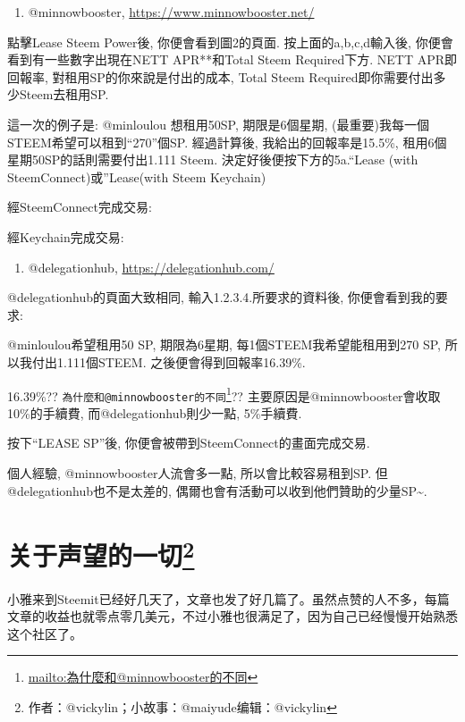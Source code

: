\documentclass[]{ctexbook}
\providecommand{\tightlist}{%
  \setlength{\itemsep}{0pt}\setlength{\parskip}{0pt}}
\renewcommand{\href}[2]{#2\footnote{\url{#1}}}
\begin{document}
\begin{enumerate}
\def\labelenumi{\arabic{enumi}.}
\tightlist
\item
  @minnowbooster, \url{https://www.minnowbooster.net/}
\end{enumerate}

點擊Lease Steem Power後, 你便會看到圖2的頁面. 按上面的a,b,c,d輸入後, 你便會看到有一些數字出現在NETT APR**和Total Steem Required下方. NETT APR即回報率, 對租用SP的你來說是付出的成本, Total Steem Required即你需要付出多少Steem去租用SP.

這一次的例子是: @minloulou 想租用50SP, 期限是6個星期, (最重要)我每一個STEEM希望可以租到``270''個SP.
經過計算後, 我給出的回報率是15.5\%, 租用6個星期50SP的話則需要付出1.111 Steem.
決定好後便按下方的5a.``Lease (with SteemConnect)或''Lease(with Steem Keychain)

經SteemConnect完成交易:

經Keychain完成交易:

\begin{enumerate}
\def\labelenumi{\arabic{enumi}.}
\setcounter{enumi}{1}
\tightlist
\item
  @delegationhub, \url{https://delegationhub.com/}
\end{enumerate}

@delegationhub的頁面大致相同, 輸入1.2.3.4.所要求的資料後, 你便會看到我的要求:

@minloulou希望租用50 SP, 期限為6星期, 每1個STEEM我希望能租用到270 SP, 所以我付出1.111個STEEM.
之後便會得到回報率16.39\%.

16.39\%?? \href{mailto:為什麼和@minnowbooster的不同}{\nolinkurl{為什麼和@minnowbooster的不同}}?? 主要原因是@minnowbooster會收取10\%的手續費, 而@delegationhub則少一點, 5\%手續費.

按下``LEASE SP''後, 你便會被帶到SteemConnect的畫面完成交易.

個人經驗, @minnowbooster人流會多一點, 所以會比較容易租到SP. 但@delegationhub也不是太差的, 偶爾也會有活動可以收到他們贊助的少量SP\textasciitilde{}.

\section[关于声望的一切]{\texorpdfstring{关于声望的一切\footnote{作者：@vickylin；小故事：@maiyude编辑：@vickylin}}{关于声望的一切}}

小雅来到Steemit已经好几天了，文章也发了好几篇了。虽然点赞的人不多，每篇文章的收益也就零点零几美元，不过小雅也很满足了，因为自己已经慢慢开始熟悉这个社区了。
\end{document}
